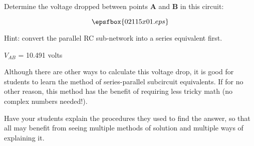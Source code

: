 

Determine the voltage dropped between points {\bf A} and {\bf B} in this circuit:

$$\epsfbox{02115x01.eps}$$

Hint: convert the parallel RC sub-network into a series equivalent first.







$V_{AB}$ = 10.491 volts







Although there are other ways to calculate this voltage drop, it is good for students to learn the method of series-parallel subcircuit equivalents.  If for no other reason, this method has the benefit of requiring less tricky math (no complex numbers needed!).

Have your students explain the procedures they used to find the answer, so that all may benefit from seeing multiple methods of solution and multiple ways of explaining it.




